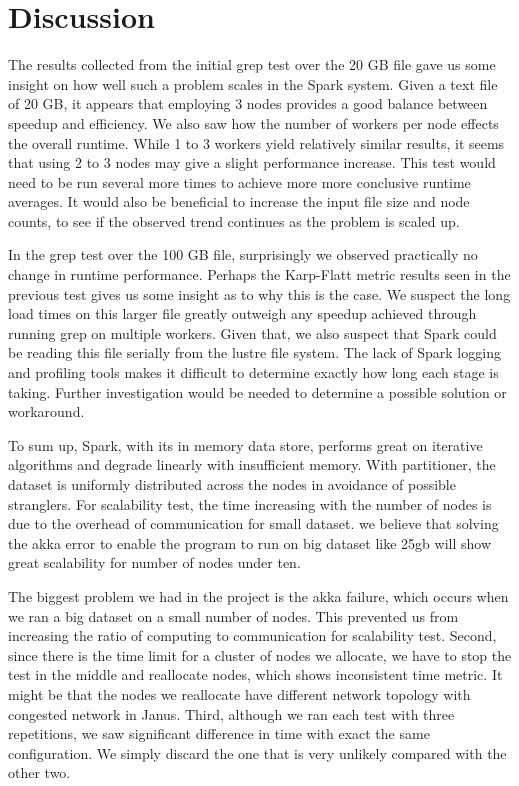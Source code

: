 \documentclass{article}
\begin{document}

\section{Discussion}
The results collected from the initial grep test over the 20 GB file gave us
some insight on how well such a problem scales in the Spark system. Given a
text file of 20 GB, it appears that employing 3 nodes provides a good balance
between speedup and efficiency. We also saw how the number of workers per node
effects the overall runtime. While 1 to 3 workers yield relatively similar
results, it seems that using 2 to 3 nodes may give a slight performance
increase. This test would need to be run several more times to achieve more
more conclusive runtime averages. It would also be beneficial to increase the
input file size and node counts, to see if the observed trend continues as the
problem is scaled up.

In the grep test over the 100 GB file, surprisingly we observed practically no
change in runtime performance. Perhaps the Karp-Flatt metric results seen in the
previous test gives us some insight as to why this is the case. We suspect the
long load times on this larger file greatly outweigh any speedup achieved
through running grep on multiple workers. Given that, we also suspect that
Spark could be reading this file serially from the lustre file system. The
lack of Spark logging and profiling tools makes it difficult to determine
exactly how long each stage is taking. Further investigation would be needed
to determine a possible solution or workaround.

To sum up, Spark, with its in memory data store, performs great on iterative algorithms and degrade linearly with insufficient memory. With partitioner, the dataset is uniformly distributed across the nodes in avoidance of possible stranglers. For scalability test, the time increasing with the number of nodes is due to the overhead of communication for small dataset. we believe that solving the akka error to enable the program to run on big dataset like 25gb will show great scalability for number of nodes under ten. 

The biggest problem we had in the project is the akka failure, which occurs when we ran a big dataset on a small number of nodes. This prevented us from increasing the ratio of computing to communication for scalability test. Second, since there is the time limit for a cluster of nodes we allocate, we have to stop the test in the middle and reallocate nodes, which shows inconsistent time metric. It might be that the nodes we reallocate have different network topology with congested network in Janus. Third, although we ran each test with three repetitions, we saw significant difference in time with exact the same configuration. We simply discard the one that is very unlikely compared with the other two.
\end{document}
